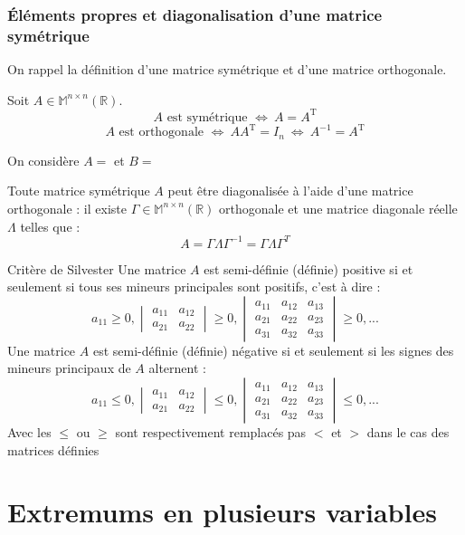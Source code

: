 \subsection{Éléments propres et diagonalisation d'une matrice symétrique}
On rappel la définition d'une matrice symétrique et d'une matrice orthogonale.
\begin{defi}
Soit $A\in\mathbb{M}^{n\times n}(\mathbb{R})$.\\
$$A\text{ est symétrique }\Leftrightarrow\ A=A^{\text{T}}$$
$$A\text{ est orthogonale }\Leftrightarrow\ AA^{\text{T}}=I_n\ \Leftrightarrow\ A^{-1}=A^{\text{T}}$$
\end{defi}
\begin{ex}
On considère $A=$ et $B=$
\end{ex}
\begin{thm}
Toute matrice symétrique $A$ peut être diagonalisée à l'aide d'une matrice orthogonale : il existe $\Gamma\in\mathbb{M}^{n\times n}(\mathbb{R})$ orthogonale et une matrice diagonale réelle $\Lambda$ telles que :
$$A=\Gamma\Lambda\Gamma^{-1}=\Gamma\Lambda\Gamma^{T}$$
\end{thm}
\begin{bclogo}[couleur=green!30,couleurBord=green,logo=\bccle ,ombre=true,arrondi=0.1]{Critère de Silvester}
Une matrice $A$ est semi-définie (définie) positive si et seulement si tous ses mineurs principales sont positifs, c'est à  dire :
$$a_{11}\ge 0, \begin{vmatrix} a_{11}&a_{12}\\ a_{21} & a_{22}\end{vmatrix}\ge 0,\begin{vmatrix}a_{11} & a_{12} & a_{13}\\ a_{21} & a_{22} & a_{23}\\ a_{31} & a_{32} & a_{33}\end{vmatrix}\ge 0, ...$$
Une matrice $A$ est semi-définie (définie) négative si et seulement si les signes des mineurs principaux de $A$ alternent :
$$a_{11}\leq 0, \begin{vmatrix} a_{11}&a_{12}\\ a_{21} & a_{22}\end{vmatrix}\leq 0,\begin{vmatrix}a_{11} & a_{12} & a_{13}\\ a_{21} & a_{22} & a_{23}\\ a_{31} & a_{32} & a_{33}\end{vmatrix}\leq 0, ...$$
Avec les $\leq$ ou $\ge$ sont respectivement remplacés pas $<$ et $>$ dans le cas des matrices définies
\end{bclogo}
\chapter{Extremums en plusieurs variables}